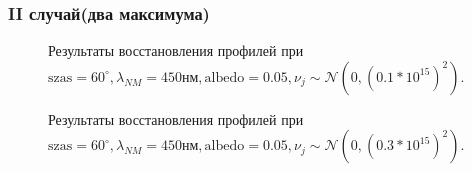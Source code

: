 \documentclass[a4paper,14pt]{article}
\theoremstyle{plain}
\theoremstyle{definition}
\theoremstyle{remark}
\begin{document}
\subsubsection{II случай(два максимума)}
\begin{figure}[bh]
\noindent{}
\caption{Результаты восстановления профилей при
$\text{szas}=60^{\circ}, \lambda_{NM}= 450\text{нм},
\text{albedo}=0.05, \nu_j \sim 
\mathcal{N}(0, (0.1 * 10^{15})^2)$.}
\label{proff_12}
\end{figure}
\clearpage
\begin{figure}[bh]
\noindent{}
\caption{Результаты восстановления профилей при
$\text{szas}=60^{\circ}, \lambda_{NM}= 450\text{нм},
\text{albedo}=0.05, \nu_j \sim 
\mathcal{N}(0, (0.3 * 10^{15})^2)$.}
\label{proff3_12}
\end{figure}
\clearpage
\end{document}
